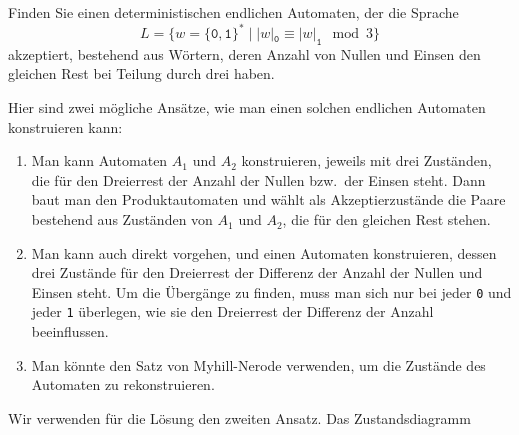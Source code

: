 Finden Sie einen deterministischen endlichen Automaten, der
die Sprache
\[
L
=
\{
w = \{\texttt{0},\texttt{1}\}^*
\;|\;
|w|_{\texttt{0}}
\equiv
|w|_{\texttt{1}}
\mod 3
\}
\]
akzeptiert,
bestehend aus Wörtern, deren Anzahl von Nullen und Einsen den 
gleichen Rest bei Teilung durch drei haben.

\begin{loesung}
Hier sind zwei mögliche Ansätze, wie man einen solchen endlichen
Automaten konstruieren kann:
\begin{enumerate}
\item
Man kann Automaten $A_1$ und $A_2$ konstruieren, jeweils mit drei Zuständen,
die für den Dreierrest der Anzahl der Nullen bzw.~der Einsen steht.
Dann baut man den Produktautomaten und wählt als Akzeptierzustände
die Paare bestehend aus Zuständen von $A_1$ und $A_2$, die für den gleichen
Rest stehen.
\item
Man kann auch direkt vorgehen, und einen Automaten konstruieren,
dessen drei Zustände für den Dreierrest der Differenz der Anzahl der
Nullen und Einsen steht.
Um die Übergänge zu finden, muss man sich nur bei jeder \texttt{0} und
jeder \texttt{1} überlegen, wie sie den Dreierrest der Differenz der
Anzahl beeinflussen.
\item
Man könnte den Satz von Myhill-Nerode verwenden, um die Zustände des
Automaten zu rekonstruieren.
\end{enumerate}
Wir verwenden für die Lösung den zweiten Ansatz.
Das Zustandsdiagramm 
\begin{center}
\end{center}
\end{loesung}
